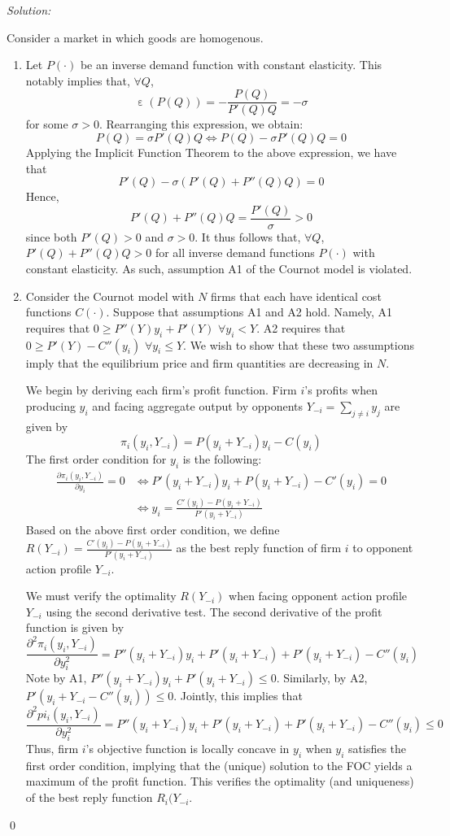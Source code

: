 \documentclass[12pt]{article}
\DeclareMathOperator{\eps}{\varepsilon}
\newenvironment{problem}[2][Problem]{\begin{trivlist}
\item[\hskip \labelsep {\bfseries #1}\hskip \labelsep {\bfseries #2.}]}{\end{trivlist}}
\newenvironment{sol}
    {\emph{Solution:}
    }
    {
    \qed
    }
\begin{document}
\begin{problem}{1}
\end{problem}
\begin{sol}
Consider a market in which goods are homogenous. 
\begin{enumerate}[label=\alph*)]
    \item Let $P(\cdot)$ be an inverse demand function with constant elasticity. This notably implies that, $\forall Q$,
    \[\eps(P(Q)) = -\frac{P(Q)}{P'(Q)Q} = -\sigma\]
    for some $\sigma >0$. Rearranging this expression, we obtain:
    \[P(Q) = \sigma P'(Q)Q \iff P(Q) - \sigma P'(Q)Q = 0\]
    Applying the Implicit Function Theorem to the above expression, we have that
    \[P'(Q) - \sigma(P'(Q) + P''(Q)Q ) = 0\]
    Hence,
    \[P'(Q) + P''(Q) Q = \frac{P'(Q)}{\sigma} > 0\]
    since both $P'(Q) > 0$ and $\sigma > 0$. It thus follows that, $\forall Q$, $P'(Q) + P''(Q) Q > 0$ for all inverse demand functions $P(\cdot)$ with constant elasticity. As such, assumption A1 of the Cournot model is violated.
    \item Consider the Cournot model with $N$ firms that each have identical cost functions $C(\cdot)$. Suppose that assumptions A1 and A2 hold. Namely, A1 requires that $0 \geq P''(Y)y_i + P'(Y)$ $\forall y_i < Y$. A2 requires that $ 0 \geq P'(Y) - C''(y_i)$ $\forall y_i \leq Y$. We wish to show that these two assumptions imply that the equilibrium price and firm quantities are decreasing in $N$.
    
    We begin by deriving each firm's profit function. Firm $i$'s profits when producing $y_i$ and facing aggregate output by opponents $Y_{-i} = \sum_{j \neq i} y_j$ are given by
    \[\pi_i(y_i, Y_{-i}) = P(y_i + Y_{-i}) y_i - C(y_i)\]
    The first order condition for $y_i$ is the following:
    \begin{align*}
        \frac{\partial \pi_i(y_i, Y_{-i})}{\partial y_i} = 0 &\iff P'(y_i + Y_{-i}) y_i + P(y_i + Y_{-i}) - C'(y_i) = 0\\
        &\iff y_i = \frac{C'(y_i) - P(y_i + Y_{-i})}{P'(y_i + Y_{-i})}
    \end{align*}
    Based on the above first order condition, we define $R(Y_{-i}) = \frac{C'(y_i) - P(y_i + Y_{-i})}{P'(y_i + Y_{-i})}$ as the best reply function of firm $i$ to opponent action profile $Y_{-i}$. 
    
    We must verify the optimality $R(Y_{-i})$ when facing opponent action profile $Y_{-i}$ using the second derivative test. The second derivative of the profit function is given by
    \[\frac{\partial^2 \pi_i(y_i, Y_{-i})}{\partial y_i^2} = P''(y_i + Y_{-i}) y_i + P'(y_i + Y_{-i}) + P'(y_i + Y_{-i}) - C''(y_i)\] 
    Note by A1, $P''(y_i + Y_{-i})y_i + P'(y_i + Y_{-i}) \leq 0$. Similarly, by A2, $P'(y_i + Y_{-i} - C''(y_i)) \leq 0$. Jointly, this implies that
    \[\frac{\partial^2 pi_i(y_i, Y_{-i})}{\partial y_i^2} = P''(y_i + Y_{-i}) y_i + P'(y_i + Y_{-i}) + P'(y_i + Y_{-i}) - C''(y_i) \leq 0\]
    Thus, firm $i$'s objective function is locally concave in $y_i$ when $y_i$ satisfies the first order condition, implying that the (unique) solution to the FOC yields a maximum of the profit function. This verifies the optimality (and uniqueness) of the best reply function $R_i(Y_{-i}$.


\end{enumerate}
\end{sol}
\end{document}
